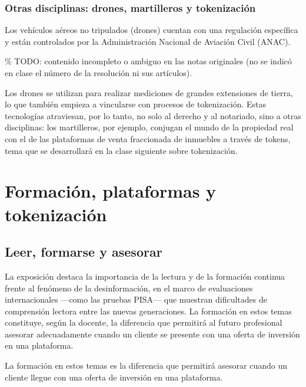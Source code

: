 \documentclass[12pt,oneside]{book}
\begin{document}
\subsection{Otras disciplinas: drones, martilleros y tokenización}

\begin{important}
Los vehículos aéreos no tripulados (drones) cuentan con una regulación específica y están controlados por la Administración Nacional de Aviación Civil (ANAC).

\% TODO: contenido incompleto o ambiguo en las notas originales (no se indicó en clase el número de la resolución ni sus artículos).
\end{important}

Los drones se utilizan para realizar mediciones de grandes extensiones de tierra, lo que también empieza a vincularse con procesos de tokenización. Estas tecnologías atraviesan, por lo tanto, no solo al derecho y al notariado, sino a otras disciplinas: los martilleros, por ejemplo, conjugan el mundo de la propiedad real con el de las plataformas de venta fraccionada de inmuebles a través de tokens, tema que se desarrollará en la clase siguiente sobre tokenización.

\chapter{Formación, plataformas y tokenización}

\section{Leer, formarse y asesorar}

La exposición destaca la importancia de la lectura y de la formación continua frente al fenómeno de la desinformación, en el marco de evaluaciones internacionales —como las pruebas PISA— que muestran dificultades de comprensión lectora entre las nuevas generaciones. La formación en estos temas constituye, según la docente, la diferencia que permitirá al futuro profesional asesorar adecuadamente cuando un cliente se presente con una oferta de inversión en una plataforma.

\begin{important}
La formación en estos temas es la diferencia que permitirá asesorar cuando un cliente llegue con una oferta de inversión en una plataforma.
\end{important}
\end{document}

